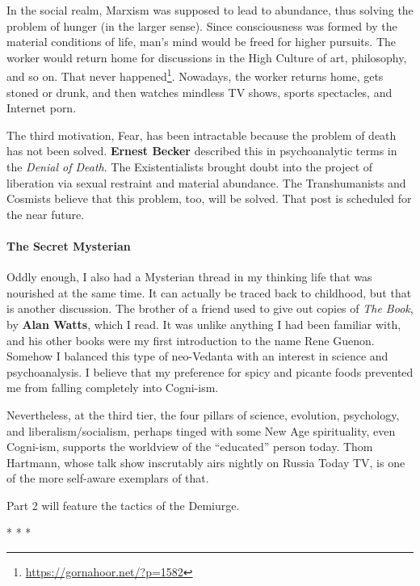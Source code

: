 In the social realm, Marxism was supposed to lead to abundance, thus solving the problem of hunger (in the larger sense). Since consciousness was formed by the material conditions of life, man's mind would be freed for higher pursuits. The worker would return home for discussions in the High Culture of art, philosophy, and so on. That never happened\footnote{\url{https://gornahoor.net/?p=1582}}. Nowadays, the worker returns home, gets stoned or drunk, and then watches mindless TV shows, sports spectacles, and Internet porn.

The third motivation, Fear, has been intractable because the problem of death has not been solved. \textbf{Ernest Becker} described this in psychoanalytic terms in the \emph{Denial of Death}. The Existentialists brought doubt into the project of liberation via sexual restraint and material abundance. The Transhumanists and Cosmists believe that this problem, too, will be solved. That post is scheduled for the near future.

\paragraph{The Secret Mysterian}


Oddly enough, I also had a Mysterian thread in my thinking life that was nourished at the same time. It can actually be traced back to childhood, but that is another discussion. The brother of a friend used to give out copies of \emph{The Book}, by \textbf{Alan Watts}, which I read. It was unlike anything I had been familiar with, and his other books were my first introduction to the name Rene Guenon. Somehow I balanced this type of neo-Vedanta with an interest in science and psychoanalysis. I believe that my preference for spicy and picante foods prevented me from falling completely into Cogni-ism.

Nevertheless, at the third tier, the four pillars of science, evolution, psychology, and liberalism/socialism, perhaps tinged with some New Age spirituality, even Cogni-ism, supports the worldview of the ``educated'' person today. Thom Hartmann, whose talk show inscrutably airs nightly on Russia Today TV, is one of the more self-aware exemplars of that.

Part 2 will feature the tactics of the Demiurge.



\begin{center}* * *\end{center}


